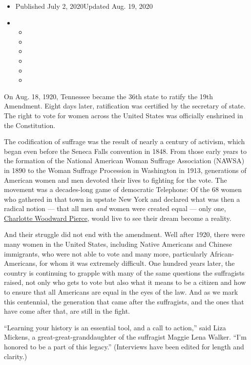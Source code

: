 \begin{itemize}
\item
  Published July 2, 2020Updated Aug. 19, 2020
\item
  \begin{itemize}
  \item
  \item
  \item
  \item
  \item
  \item
  \end{itemize}
\end{itemize}

On Aug. 18, 1920, Tennessee became the 36th state to ratify the 19th
Amendment. Eight days later, ratification was certified by the secretary
of state. The right to vote for women across the United States was
officially enshrined in the Constitution.

The codification of suffrage was the result of nearly a century of
activism, which began even before the Seneca Falls convention in 1848.
From those early years to the formation of the National American Woman
Suffrage Association (NAWSA) in 1890 to the Woman Suffrage Procession in
Washington in 1913, generations of American women and men devoted their
lives to fighting for the vote. The movement was a decades-long game of
democratic Telephone: Of the 68 women who gathered in that town in
upstate New York and declared what was then a radical notion --- that
all men \emph{and} women were created equal --- only one,
\href{https://www.smithsonianmag.com/smart-news/only-one-woman-who-was-seneca-falls-lived-see-women-win-vote-180964044/}{Charlotte
Woodward Pierce}, would live to see their dream become a reality.

And their struggle did not end with the amendment. Well after 1920,
there were many women in the United States, including Native Americans
and Chinese immigrants, who were not able to vote and many more,
particularly African-Americans, for whom it was extremely difficult. One
hundred years later, the country is continuing to grapple with many of
the same questions the suffragists raised, not only who gets to vote but
also what it means to be a citizen and how to ensure that all Americans
are equal in the eyes of the law. And as we mark this centennial, the
generation that came after the suffragists, and the ones that have come
after that, are still in the fight.

``Learning your history is an essential tool, and a call to action,''
said Liza Mickens, a great-great-granddaughter of the suffragist Maggie
Lena Walker. ``I'm honored to be a part of this legacy.'' (Interviews
have been edited for length and clarity.)

